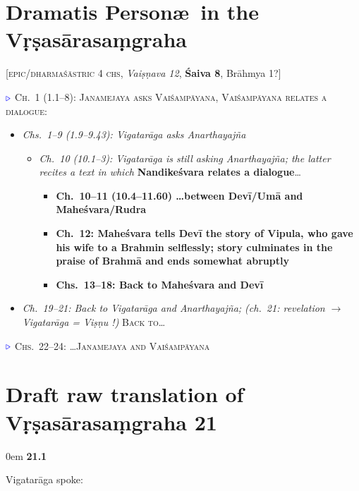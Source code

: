 \documentclass[12pt]{article} %
\newcommand{\epic}[1]{\textsc{#1}}
\newcommand{\saiva}[1]{\textbf{#1}}
\newcommand{\vaisnava}[1]{\textit{#1}}
\newcommand{\brahma}[1]{{\textrm{#1}}}
\begin{document}
\section{Dramatis Person\ae\ in the Vṛṣasārasaṃgraha}  %
		
		[\epic{epic/dharmaśāstric 4 chs}, \vaisnava{Vaiṣṇava 12}, \saiva{Śaiva 8}, \brahma{Brāhmya} 1?]
		\bigskip

\noindent
$\textcolor{blue}{\triangleright}$ \epic{Ch.\ 1 (1.1--8): Janamejaya asks Vaiśampāyana, Vaiśampāyana relates a dialogue:}
				\begin{itemize}
				\item  \vaisnava{Chs.\ 1--9 (1.9--9.43): 
						Vigatarāga asks Anarthayajña}
					\begin{itemize}
						\item   \vaisnava{Ch.\ 10 (10.1--3):
						Vigatarāga is still asking Anarthayajña; 
						the latter recites a text in which} 
							\saiva{Nandikeśvara relates a dialogue}\dots
							\begin{itemize}
							\item \saiva{Ch.\ 10--11 (10.4--11.60) 
													\dots between Devī/Umā and 
													Mahe\-śva\-ra/Rudra}
							\item  \saiva{Ch.\ 12: 
							Mahe\-ś\-va\-ra tells Devī the story of \brahma{Vipula, who 
							gave his wife to a Brahmin selflessly; story 
							culminates in the praise of Brahmā} and ends
							somewhat abruptly}
							\item  \saiva{Chs.\ 13--18: Back to Maheśvara and Devī}
							\end{itemize}
					\end{itemize}
					\item  \vaisnava{Ch.\ 19--21: 
					Back to Vigatarāga and Anarthayajña;\linebreak
					(ch.\ 21: revelation $\rightarrow$ Vigatarāga = Viṣṇu !)} 
					\epic{Back to\dots}
				\end{itemize}
$\textcolor{blue}{\triangleright}$  \epic{Chs.\ 22--24: \dots Janamejaya and Vaiśampāyana}



\section{Draft raw translation of Vṛṣasārasaṃgraha 21}

\parindent0em
\textbf{21.1} 

Vigatarāga spoke: 
    
\end{document}
